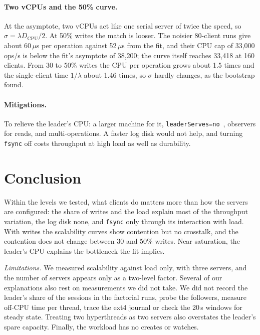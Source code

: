 \documentclass{llncs}
\begin{document}
\paragraph{Two vCPUs and the 50\% curve.} At the asymptote, two vCPUs act like one serial server of twice the speed, so $\sigma=\lambda D_{\mathrm{CPU}}/2$. At 50\% writes the match is looser. The noisier 80-client runs give about 60\,$\mu$s per operation against 52\,$\mu$s from the fit, and their CPU cap of 33{,}000 ops/s is below the fit's asymptote of 38{,}200; the curve itself reaches 33{,}418 at 160 clients. From 30 to 50\% writes the CPU per operation grows about 1.5 times and the single-client time $1/\lambda$ about 1.46 times, so $\sigma$ hardly changes, as the bootstrap found.

\paragraph{Mitigations.} To relieve the leader's CPU: a larger machine for it, \texttt{leader\-Serves=no}~\cite{zookeeper_admin}, observers for reads, and multi-operations. A faster log disk would not help, and turning \texttt{fsync} off costs throughput at high load as well as durability.

\section{Conclusion}

Within the levels we tested, what clients do matters more than how the servers are configured: the share of writes and the load explain most of the throughput variation, the log disk none, and \texttt{fsync} only through its interaction with load. With writes the scalability curves show contention but no crosstalk, and the contention does not change between 30 and 50\% writes. Near saturation, the leader's CPU explains the bottleneck the fit implies.

\emph{Limitations.} We measured scalability against load only, with three servers, and the number of servers appears only as a two-level factor. Several of our explanations also rest on measurements we did not take. We did not record the leader's share of the sessions in the factorial runs, probe the followers, measure off-CPU time per thread, trace the ext4 journal or check the 20\,s windows for steady state. Treating two hyperthreads as two servers also overstates the leader's spare capacity. Finally, the workload has no creates or watches.
\end{document}
